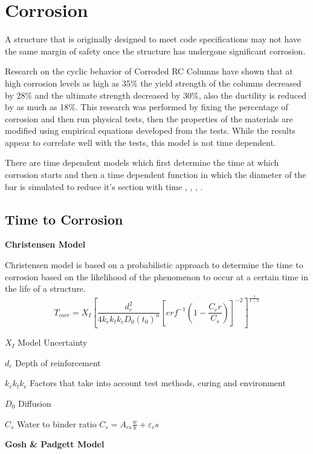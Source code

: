 \section{Corrosion}

A structure that is originally designed to meet code specifications may not have the same margin of safety once the structure has undergone significant corrosion. 

Research on the cyclic behavior of Corroded RC Columns \cite{Yuan2017a} have shown that at high corrosion levels as high as 35\% the yield strength of the columns decreased by 28\% and the ultimate strength decreased by 30\%, also the ductility is reduced by as much as 18\%. This research was performed by fixing the percentage of corrosion and then run physical tests, then the properties of the materials are modified using empirical equations developed from the tests. While the results appear to correlate well with the tests, this model is not time dependent.

There are time dependent models which first determine the time at which corrosion starts and then a time dependent function in which the diameter of the bar is simulated to reduce it’s section with time \cite{Y.Liu1998a}, \cite{Choe2008}, \cite{Thoft-Christensen}, \cite{Vu2000}.

\subsection{Time to Corrosion}

\textbf{Christensen Model}

Christensen model is based on a probabilistic approach to determine the time to corrosion based on the likelihood of the phenomenon to occur at a certain time in the life of a structure. 
\begin{equation}
  T_{corr}=X_I \left[\frac{d_c^2}{4k_e k_t k_c D_0 (t_0 )^n }\left[erf^{-1} \left(1-\frac{C_cr}{C_s} \right) \right]^{-2} \right]^{\frac{1}{1-n}}
  \label{eq:one}
\end{equation} 

$X_I$ Model Uncertainty

$d_c$ Depth of reinforcement

$k_e k_t k_c$ Factors that take into account test methods, curing and environment

$D_0$ Diffusion

$C_s$ Water to binder ratio $C_s=A_{cs}\frac{w}{b}+\varepsilon_cs$


\textbf{Gosh \& Padgett Model}

